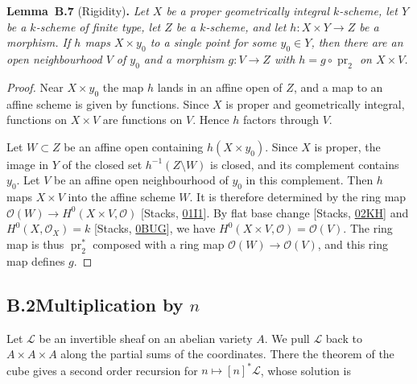 \documentclass[11pt]{article}
\newenvironment{bpstatement}[2]{\par\addvspace{0.6\baselineskip}\noindent\textbf{#1}#2\textbf{.}\enspace\ignorespaces}
  {\par\addvspace{0.4\baselineskip}}
\newenvironment{bpstatementit}[2]{\begin{bpstatement}{#1}{#2}\itshape\ignorespaces}{\end{bpstatement}}
\begin{document}
\label{bp94}%
\begin{bpstatementit}{Lemma~B.7}{ (Rigidity)}
Let \(X\) be a proper geometrically integral \(k\)-scheme, let \(Y\) be a \(k\)-scheme of finite type, let \(Z\) be a \(k\)-scheme, and let \(h:X\times Y\to Z\) be a morphism. If \(h\) maps \(X\times y_0\) to a single point for some \(y_0\in Y\), then there are an open neighbourhood \(V\) of \(y_0\) and a morphism \(g:V\to Z\) with \(h=g\circ\operatorname{pr}_2\) on \(X\times V\).
\end{bpstatementit}

\begin{proof}[{Proof}]\label{bp95}%
Near \(X\times y_0\) the map \(h\) lands in an affine open of \(Z\), and a map to an affine scheme is given by functions. Since \(X\) is proper and geometrically integral, functions on \(X\times V\) are functions on \(V\). Hence \(h\) factors through \(V\).

Let \(W\subset Z\) be an affine open containing \(h(X\times y_0)\). Since \(X\) is proper, the image in \(Y\) of the closed set \(h^{-1}(Z\setminus W)\) is closed, and its complement contains \(y_0\). Let \(V\) be an affine open neighbourhood of \(y_0\) in this complement. Then \(h\) maps \(X\times V\) into the affine scheme \(W\). It is therefore determined by the ring map \(\mathcal O(W)\to H^0(X\times V,\mathcal O)\) [Stacks, \href{https://stacks.math.columbia.edu/tag/01I1}{01I1}]. By flat base change [Stacks, \href{https://stacks.math.columbia.edu/tag/02KH}{02KH}] and \(H^0(X,\mathcal O_X)=k\) [Stacks, \href{https://stacks.math.columbia.edu/tag/0BUG}{0BUG}], we have \(H^0(X\times V,\mathcal O)=\mathcal O(V)\). The ring map is thus \(\operatorname{pr}_2^*\) composed with a ring map \(\mathcal O(W)\to\mathcal O(V)\), and this ring map defines \(g\).
\end{proof}


\subsection*{\texorpdfstring{B.2\quad Multiplication by $n$}{B.2 Multiplication by n}}
\label{bp96}%
\label{bp97}%
Let \(\mathcal L\) be an invertible sheaf on an abelian variety \(A\). We pull \(\mathcal L\) back to \(A\times A\times A\) along the partial sums of the coordinates. There the theorem of the cube gives a second order recursion for \(n\mapsto[n]^*\mathcal L\), whose solution is
\end{document}
